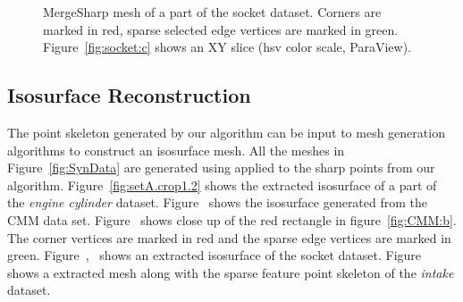 \begin{figure}[htb]
    \centering
    \caption{MergeSharp mesh of a part of the socket dataset. Corners are marked in red, sparse selected edge vertices are marked in green. Figure~\ref{fig:socket:c} shows an XY slice (hsv color scale, ParaView).}
    \label{fig:socket}
\end{figure}
\subsection{Isosurface Reconstruction}
The point skeleton generated by our algorithm can be input to mesh generation algorithms
to construct an isosurface mesh.
All the meshes  in Figure~\ref{fig:SynData} are generated using \MergeSharp applied
to the sharp points from our algorithm.
Figure~\ref{fig:setA.crop1.2} shows the extracted isosurface of a part of the \emph{engine cylinder} dataset.
  Figure~ shows the isosurface generated from the CMM data set. Figure~ shows close up of the red rectangle in figure~\ref{fig:CMM:b}. The corner vertices are marked in red and the sparse edge vertices are marked in green. Figure~,~ shows an extracted isosurface of the socket dataset. Figure~ shows a \MergeSharp extracted mesh along with the sparse feature point skeleton of the \emph{intake} dataset.

